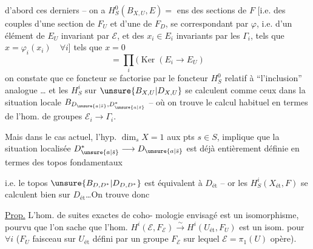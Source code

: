 d'abord ces derniers -- on a
$H^0_S(B_{X,U},E)={}$ ens des sections de $F$ [i.e. des
couples d'une section de $F_U$ et
d'une de $F_D$, se correspondant
par $\varphi$, i.e. d'un élément  de
$E_U$ invariant par $\mathcal E$, et des
$x_i\in E_i$ invariants par les $\Gamma_i$,
tels que $x=\varphi_i(x_i)\quad\forall i$]
tels que $x=0$ 
\[
=\prod_i(\operatorname{Ker}(E_i\longrightarrow E_U)
\]
on constate que ce foncteur se factorise
par le foncteur $H^0_S$ relatif à ``l'inclusion''
analogue 
\ldots
et les $H^i_S$ sur $\unsure{B_{X,U}|D_{X,U}}$ se calculent comme
ceux dans la situation locale $B_{D_{\unsure{a|\bar s}},D^{*}_{\unsure{a|\bar s}}}$ --
où on trouve le calcul habituel en
termes de l'hom. de groupes $\mathcal E_i\longrightarrow\Gamma_i$.

Mais dans le cas actuel, l'hyp. $\dim_s X=1$
aux pts  $s\in S$,  implique que
la situation  localisée $D^{*}_{\unsure{a|\bar s}}\longrightarrow D_{\unsure{a|\bar s}}$ est déjà entièrement
définie en termes des topos fondamentaux 

i.e. le topos $\unsure{B_{D,D^{*}}|D_{D,D^{*}}}$ est équivalent à
$D_{\mathrm{ét}}$ -- or les $H^i_S(X_{\mathrm{ét}},F)$ se calculent
bien sur $D_{\mathrm{ét}}$\ldots On trouve donc

\uline{Prop.} L'hom. de suites exactes de coho-
mologie envisagé est un isomorphisme,
pourvu que l'on sache que l'hom.
$H^i(\mathcal E,F_{\mathcal E})\xrightarrow{\sim}H^i(U_{\mathrm{ét}},F_U)$ est un isom.
pour $\forall i$ ($F_U$ faisceau  sur $U_{\mathrm{ét}}$
défini par un groupe $F_{\mathcal E}$ sur lequel $\mathcal E=\pi_1(U)$
opère).

